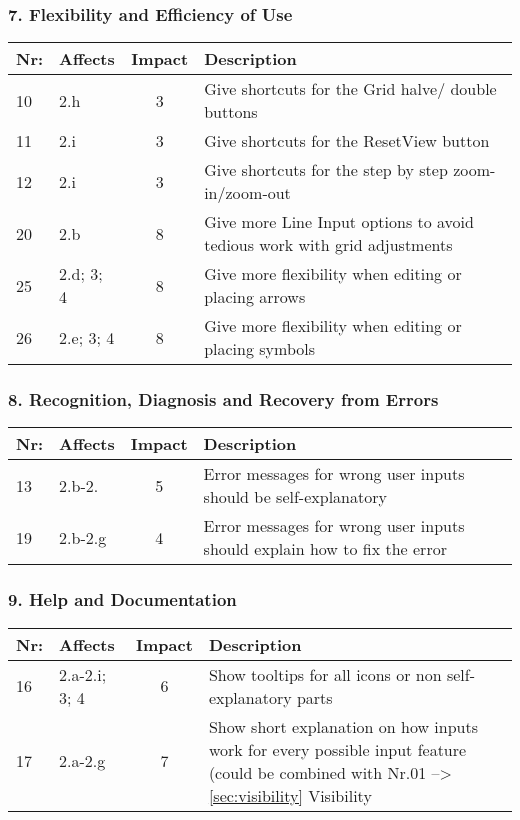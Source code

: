 \subsubsection*{7. Flexibility and Efficiency of Use}
        \begin{tabular}{l | p{} | c | p{}}
        Nr: & Affects & Impact & Description \\ \hline
        10 & 2.h & 3 & Give shortcuts for the Grid halve/ double buttons\\ \hline
        11 & 2.i  & 3 & Give shortcuts for the ResetView button\\ \hline
        12 & 2.i & 3 & Give shortcuts for the step by step zoom-in/zoom-out\\ \hline
        20 & 2.b & 8 & Give more Line Input options to avoid tedious work with grid adjustments\\ \hline
        25 & 2.d; 3; 4 & 8 & Give more flexibility when editing or placing arrows\\ \hline
        26 & 2.e; 3; 4 & 8 & Give more flexibility when editing or placing symbols\\ \hline
        \end{tabular}

\subsubsection*{8. Recognition, Diagnosis and Recovery from Errors}
        \begin{tabular}{l | p{} | c | p{}}
        Nr: & Affects & Impact & Description \\ \hline
        13 & 2.b-2. & 5 & Error messages for wrong user inputs should be self-explanatory\\ \hline
        19 & 2.b-2.g & 4 & Error messages for wrong user inputs should explain how to fix the error\\ \hline
        \end{tabular}

\subsubsection*{9. Help and Documentation}

        \begin{tabular}{l | p{} | c | p{}}
        Nr: & Affects & Impact & Description \\ \hline
        16 & 2.a-2.i; 3; 4 & 6 & Show tooltips for all icons or non self-explanatory parts\\ \hline 
        17 & 2.a-2.g & 7 & Show short explanation on how inputs work for every possible input feature (could be combined with Nr.01 --> \ref{sec:visibility} Visibility\\ \hline
        \end{tabular}

